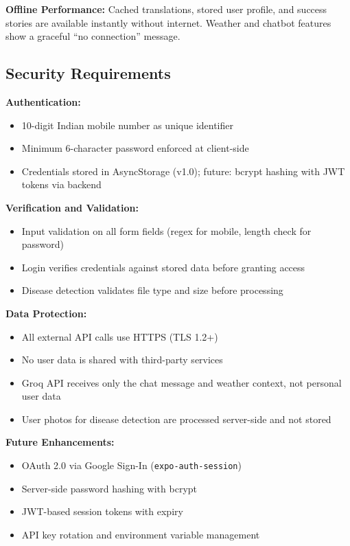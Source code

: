\documentclass[12pt,a4paper]{article}
\begin{document}
\textbf{Offline Performance:} Cached translations, stored user profile, and success stories are available instantly without internet. Weather and chatbot features show a graceful ``no connection'' message.

\subsection{Security Requirements}

\textbf{Authentication:}
\begin{itemize}
    \item 10-digit Indian mobile number as unique identifier
    \item Minimum 6-character password enforced at client-side
    \item Credentials stored in AsyncStorage (v1.0); future: bcrypt hashing with JWT tokens via backend
\end{itemize}

\textbf{Verification and Validation:}
\begin{itemize}
    \item Input validation on all form fields (regex for mobile, length check for password)
    \item Login verifies credentials against stored data before granting access
    \item Disease detection validates file type and size before processing
\end{itemize}

\textbf{Data Protection:}
\begin{itemize}
    \item All external API calls use HTTPS (TLS 1.2+)
    \item No user data is shared with third-party services
    \item Groq API receives only the chat message and weather context, not personal user data
    \item User photos for disease detection are processed server-side and not stored
\end{itemize}

\textbf{Future Enhancements:}
\begin{itemize}
    \item OAuth 2.0 via Google Sign-In (\texttt{expo-auth-session})
    \item Server-side password hashing with bcrypt
    \item JWT-based session tokens with expiry
    \item API key rotation and environment variable management
\end{itemize}
\end{document}
